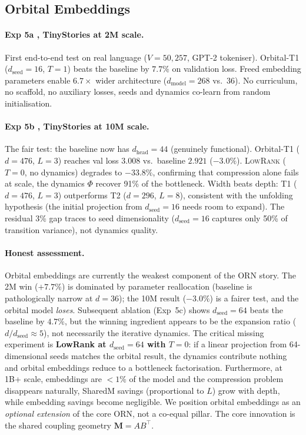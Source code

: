 \documentclass[11pt, a4paper]{article}
\newcommand{\M}{\mathbf{M}}
\theoremstyle{remark}
\begin{document}
\subsection{Orbital Embeddings}

\paragraph{Exp 5a ,  TinyStories at 2M scale.}
First end-to-end test on real language ($V{=}50{,}257$, GPT-2 tokeniser).
Orbital-T1 ($d_{\text{seed}}{=}16$, $T{=}1$) beats the baseline by $7.7\%$ on validation loss.
Freed embedding parameters enable $6.7\times$ wider architecture ($d_{\text{model}} = 268$ vs.\ $36$).
No curriculum, no scaffold, no auxiliary losses, seeds and dynamics co-learn from random initialisation.

\paragraph{Exp 5b ,  TinyStories at 10M scale.}
The fair test: the baseline now has $d_{\text{head}} = 44$ (genuinely functional).
Orbital-T1 ($d = 476$, $L = 3$) reaches val loss $3.008$ vs.\ baseline $2.921$ ($-3.0\%$).
\textsc{LowRank} ($T{=}0$, no dynamics) degrades to $-33.8\%$, confirming that compression alone fails at scale, the dynamics $\Phi$ recover 91\% of the bottleneck.
Width beats depth: T1 ($d = 476$, $L = 3$) outperforms T2 ($d = 296$, $L = 8$), consistent with the unfolding hypothesis (the initial projection from $d_{\text{seed}} = 16$ needs room to expand).
The residual 3\% gap traces to seed dimensionality ($d_{\text{seed}} = 16$ captures only 50\% of transition variance), not dynamics quality.

\paragraph{Honest assessment.}
Orbital embeddings are currently the weakest component of the ORN story.
The 2M win ($+7.7\%$) is dominated by parameter reallocation (baseline is pathologically narrow at $d{=}36$); the 10M result ($-3.0\%$) is a fairer test, and the orbital model \emph{loses}.
Subsequent ablation (Exp~5c) shows $d_{\text{seed}}{=}64$ beats the baseline by $4.7\%$, but the winning ingredient appears to be the expansion ratio ($d/d_{\text{seed}} \approx 5$), not necessarily the iterative dynamics.
The critical missing experiment is \textbf{LowRank at $d_{\text{seed}}{=}64$ with $T{=}0$}: if a linear projection from 64-dimensional seeds matches the orbital result, the dynamics contribute nothing and orbital embeddings reduce to a bottleneck factorisation.
Furthermore, at 1B+ scale, embeddings are ${<}1\%$ of the model and the compression problem disappears naturally, SharedM savings (proportional to $L$) grow with depth, while embedding savings become negligible.
We position orbital embeddings as an \emph{optional extension} of the core ORN, not a co-equal pillar.
The core innovation is the shared coupling geometry $\M = AB^\top$.
\end{document}
